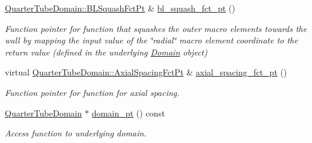 \begin{DoxyCompactItemize}
\hyperlink{classoomph_1_1QuarterTubeDomain_a3d8c15c17d9912d8c519c028437c0b2c}{Quarter\+Tube\+Domain\+::\+B\+L\+Squash\+Fct\+Pt} \& \hyperlink{classoomph_1_1QuarterTubeMesh_afa145689b62afa7e66573c8c42bda8dd}{bl\+\_\+squash\+\_\+fct\+\_\+pt} ()
\begin{DoxyCompactList}\small\item\em Function pointer for function that squashes the outer macro elements towards the wall by mapping the input value of the \char`\"{}radial\char`\"{} macro element coordinate to the return value (defined in the underlying \hyperlink{classoomph_1_1Domain}{Domain} object) \end{DoxyCompactList}\item 
virtual \hyperlink{classoomph_1_1QuarterTubeDomain_ae347af42a5dcb9b3b82c2247975b01db}{Quarter\+Tube\+Domain\+::\+Axial\+Spacing\+Fct\+Pt} \& \hyperlink{classoomph_1_1QuarterTubeMesh_a5c880d6214a07676a533227f813634d8}{axial\+\_\+spacing\+\_\+fct\+\_\+pt} ()
\begin{DoxyCompactList}\small\item\em Function pointer for function for axial spacing. \end{DoxyCompactList}\item 
\hyperlink{classoomph_1_1QuarterTubeDomain}{Quarter\+Tube\+Domain} $\ast$ \hyperlink{classoomph_1_1QuarterTubeMesh_a351b2060f43c881d7bda9b7ef4a1c32e}{domain\+\_\+pt} () const
\begin{DoxyCompactList}\small\item\em Access function to underlying domain. \end{DoxyCompactList}\end{DoxyCompactItemize}

